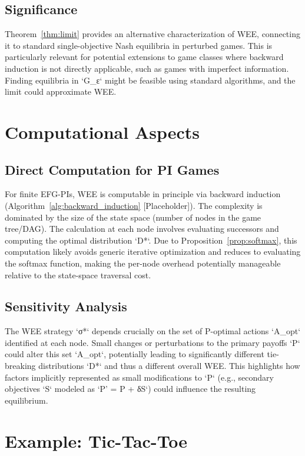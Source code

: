 \documentclass{article}
\begin{document}
\subsection{Significance}
Theorem~\ref{thm:limit} provides an alternative characterization of WEE, connecting it to standard single-objective Nash equilibria in perturbed games. This is particularly relevant for potential extensions to game classes where backward induction is not directly applicable, such as games with imperfect information. Finding equilibria in `G_ε` might be feasible using standard algorithms, and the limit could approximate WEE.

\section{Computational Aspects}

\subsection{Direct Computation for PI Games}
For finite EFG-PIs, WEE is computable in principle via backward induction (Algorithm~\ref{alg:backward_induction} [Placeholder]). The complexity is dominated by the size of the state space (number of nodes in the game tree/DAG). The calculation at each node involves evaluating successors and computing the optimal distribution `D*`. Due to Proposition~\ref{prop:softmax}, this computation likely avoids generic iterative optimization and reduces to evaluating the softmax function, making the per-node overhead potentially manageable relative to the state-space traversal cost.

\subsection{Sensitivity Analysis}
The WEE strategy `σ*` depends crucially on the set of P-optimal actions `A_opt` identified at each node. Small changes or perturbations to the primary payoffs `P` could alter this set `A_opt`, potentially leading to significantly different tie-breaking distributions `D*` and thus a different overall WEE. This highlights how factors implicitly represented as small modifications to `P` (e.g., secondary objectives `S` modeled as `P' = P + δS`) could influence the resulting equilibrium.

\section{Example: Tic-Tac-Toe}
\end{document}
